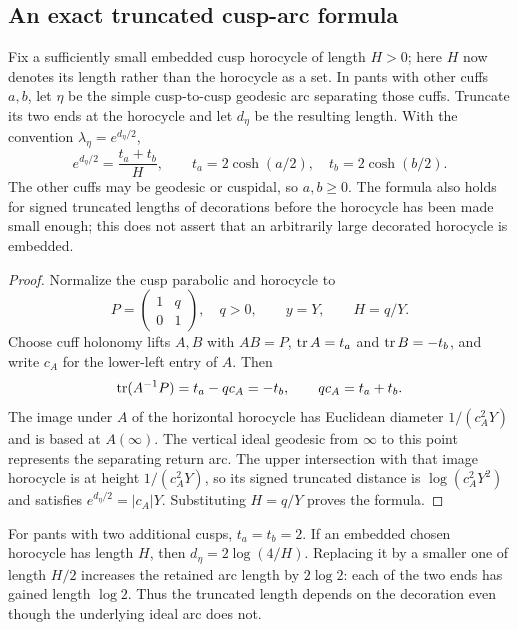 \subsection{An exact truncated cusp-arc formula}

Fix a sufficiently small embedded cusp horocycle of length $H>0$; here $H$ now
denotes its length rather than the horocycle as a set. In pants with other
cuffs $a,b$, let $\eta$ be the simple cusp-to-cusp geodesic arc separating
those cuffs. Truncate its two ends at the horocycle and let $d_\eta$ be
the resulting length. With the convention $\lambda_\eta=e^{d_\eta/2}$,
\begin{equation}
 \boxed{e^{d_\eta/2}=\frac{t_a+t_b}{H},
        \qquad t_a=2\cosh(a/2),\quad t_b=2\cosh(b/2).}
 \label{eq:cusplambda}
\end{equation}
The other cuffs may be geodesic or cuspidal, so $a,b\geq0$.
The formula also holds for signed truncated lengths of decorations before
the horocycle has been made small enough; this does not assert that an
arbitrarily large decorated horocycle is embedded.

\begin{proof}
Normalize the cusp parabolic and horocycle to
\[
 P=\begin{pmatrix}1&q\\0&1\end{pmatrix},\quad q>0,\qquad y=Y,
 \qquad H=q/Y.
\]
Choose cuff holonomy lifts $A,B$ with $AB=P$, $\operatorname{tr} A=t_a$ and
$\operatorname{tr} B=-t_b$, and write $c_A$ for the lower-left entry of $A$. Then
\[
 \operatorname{tr}(A^{-1}P)=t_a-qc_A=-t_b,
 \qquad qc_A=t_a+t_b.
\]
The image under $A$ of the horizontal horocycle has Euclidean diameter
$1/(c_A^2Y)$ and is based at $A(\infty)$. The vertical ideal geodesic
from $\infty$ to this point represents the separating return arc.
The upper intersection with that image horocycle is at height
$1/(c_A^2Y)$, so its signed truncated distance is
$\log(c_A^2Y^2)$ and satisfies
$e^{d_\eta/2}=|c_A|Y$. Substituting $H=q/Y$ proves the formula.
\end{proof}

For pants with two additional cusps, $t_a=t_b=2$.
If an embedded chosen horocycle has length $H$, then
$d_\eta=2\log(4/H)$. Replacing it by a smaller one of length
$H/2$ increases the retained arc length by $2\log2$:
each of the two ends has gained length $\log2$.
Thus the truncated length depends on the decoration even though
the underlying ideal arc does not.

